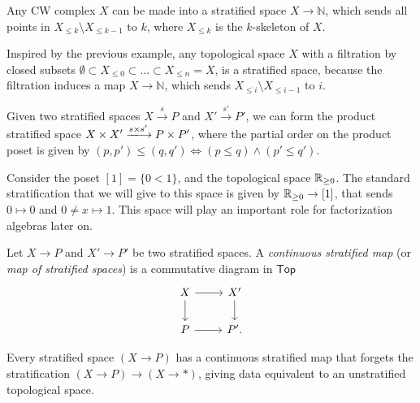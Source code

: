 \documentclass[../text]{subfiles}
\begin{document}
\begin{example}
    Any CW complex $X$ can be made into a stratified space $X \rightarrow \mathbb{N}$, which sends all points in $X_{\leq k} \setminus {X_{\leq k-1}}$ to $k$, where $X_{\leq k}$ is the $k$-skeleton of $X$.
\end{example}

\begin{example}
    Inspired by the previous example, any topological space $X$ with a filtration by closed subsets $\emptyset \subset X_{\leq 0} \subset \dots \subset X_{\leq n} = X$, is a stratified space, because the filtration induces a map $X \rightarrow \mathbb{N}$, which sends $X_{\leq i} \setminus X_{\leq i-1}$ to $i$.
\end{example}

\begin{remark}
    Given two stratified spaces $X \xrightarrow{s} P$ and $X' \xrightarrow{s'} P'$, we can form the product stratified space $X \times X' \xlongrightarrow{s \times s'} P \times P'$, where the partial order on the product poset is given by $(p,p') \leq (q, q') \iff (p \leq q) \land (p' \leq q')$.
\end{remark}

\begin{example}
    Consider the poset $[1] = \{0 < 1\}$, and the topological space $\mathbb{R}_{\geq 0}$. The standard stratification that we will give to this space is given by $\mathbb{R}_{\geq 0} \rightarrow [1]$, that sends $0 \mapsto 0$ and $0 \neq x \mapsto 1$. This space will play an important role for factorization algebras later on.
\end{example}

\begin{definition}
    Let $X \rightarrow P$ and $X' \rightarrow P'$ be two stratified spaces. A \emph{continuous stratified map} (or \emph{map of stratified spaces}) is a commutative diagram in $\mathsf{Top}$
    \begin{equation}
        \begin{tikzcd}
            X \arrow[r] \arrow[d] & X' \arrow[d] \\
            P \arrow[r] & P'.
        \end{tikzcd}
    \end{equation}
\end{definition}

\begin{example}\label{ex:forget_strat}
    Every stratified space $(X \rightarrow P)$ has a continuous stratified map that forgets the stratification $(X \rightarrow P) \rightarrow (X \rightarrow *)$, giving data equivalent to an unstratified topological space. 
\end{example}
\end{document}
